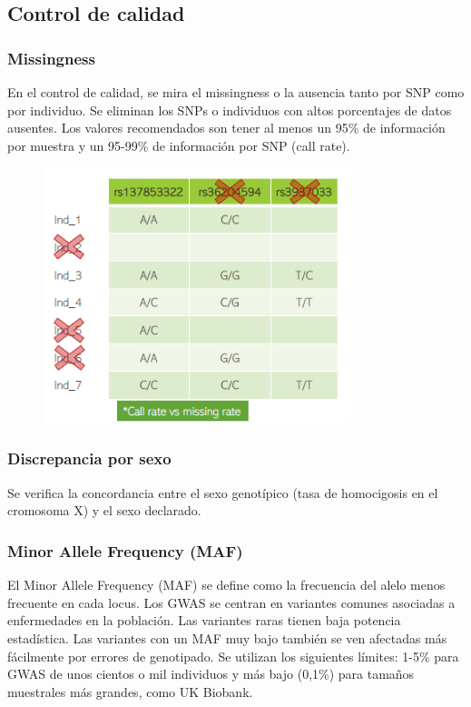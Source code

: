 \subsection{Control de calidad}
\subsubsection{Missingness}
En el control de calidad, se mira el missingness o la ausencia tanto por SNP como por individuo. Se eliminan los SNPs o individuos con altos porcentajes de datos ausentes. Los valores recomendados son tener al menos un 95\% de información por muestra y un 95-99\% de información por SNP (call rate).

\begin{figure}[htbp]
\centering
\includegraphics[width = 0.8\textwidth]{figs/missingness.png}
\end{figure}

\subsubsection{Discrepancia por sexo}
Se verifica la concordancia entre el sexo genotípico (tasa de homocigosis en el cromosoma X) y el sexo declarado.


\subsubsection{Minor Allele Frequency (MAF)}
El Minor Allele Frequency (MAF) se define como la frecuencia del alelo menos frecuente en cada locus. Los GWAS se centran en variantes comunes asociadas a enfermedades en la población. Las variantes raras tienen baja potencia estadística.
Las variantes con un MAF muy bajo también se ven afectadas más fácilmente por errores de genotipado. Se utilizan los siguientes límites: 1-5\% para GWAS de unos cientos o mil individuos y más bajo (0,1\%) para tamaños muestrales más grandes, como UK Biobank.

